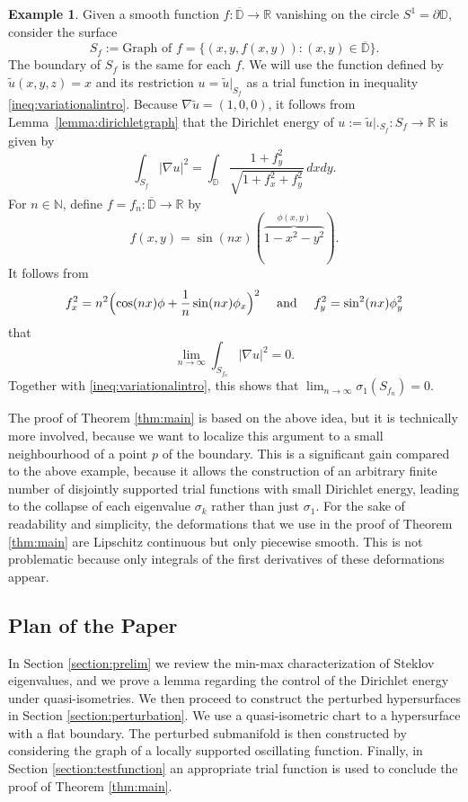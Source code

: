 \documentclass{CUP-JNL-FMP}%
\theoremstyle{definition}
\newtheorem{example}[theorem]{Example}
\numberwithin{equation}{section}
\begin{document}
\begin{example}
Given a smooth function $f\colon \overline{\mathbb{D}}\rightarrow\mathbb{R}$ vanishing on the circle $S^1=\partial\mathbb{D}$, consider the surface
$$
S_f:=\mbox{Graph of }f=
\big\{(x,y,f(x,y)) : (x,y)\in\overline{\mathbb{D}}\big\}.
$$
The boundary of $S_f$ is the same for each $f$.
We will use the function defined by $\widetilde{u}(x,y,z)=x$ and its restriction $u=\widetilde{u}|_{S_f}$ as a trial function in inequality \eqref{ineq:variationalintro}. Because $\nabla\widetilde{u}=(1,0,0)$, it follows from Lemma~\ref{lemma:dirichletgraph} that the Dirichlet energy of $u:=\widetilde{u}
\bigl|\bigr._{{S_f}} \colon S_f\rightarrow\mathbb{R}$ is given by
$$\int_{S_f}|\nabla u|^2=\int_{\mathbb{D}} \frac{1 + f_y^2}{\sqrt{1 + f_x^2+f_y^2}}
\,dxdy.$$
For $n\in\mathbb{N}$, define $f=f_n\colon \overline{\mathbb{D}}\rightarrow\mathbb{R}$ by
$$f(x,y)=\sin(nx)(\overbrace{1-x^2-y^2}^{\phi(x,y)}).$$
It follows from
\begin{gather*}
f_x^2=n^2\Bigl(\cos(nx)\phi+\frac{1}{n}\sin(nx)\phi_x\Bigr)^2\quad\mbox{ and }\quad
f_y^2=\sin^2(nx)\phi_y^2
\end{gather*}
that
$$\lim_{n\to\infty}\int_{S_{f_n}}|\nabla u|^2=0.$$
Together with \eqref{ineq:variationalintro}, this shows that
$\lim_{n\to\infty}\sigma_1(S_{f_n})=0.$
\end{example}


The proof of Theorem \ref{thm:main} is based on the above idea, but it is technically more involved, because we want to localize this argument to a small neighbourhood of a point $p$ of the boundary. This is a significant gain compared to the above example, because it allows the construction of an arbitrary finite number of disjointly supported trial functions with small Dirichlet energy, leading to the collapse of each eigenvalue $\sigma_k$ rather than just $\sigma_1$. For the sake of readability and simplicity, the deformations that we use in the proof of Theorem \ref{thm:main} are Lipschitz continuous but only piecewise smooth. This is not problematic because only integrals of the first derivatives of these deformations appear.


\subsection*{Plan of the Paper}
In Section \ref{section:prelim} we review the min-max characterization of Steklov eigenvalues, and we prove a lemma regarding the control of the Dirichlet energy under quasi-isometries. We then proceed to construct the perturbed hypersurfaces in Section \ref{section:perturbation}. We use a quasi-isometric chart to a hypersurface with a flat boundary. The perturbed submanifold is then constructed by considering the graph
of a locally supported oscillating function. Finally, in Section \ref{section:testfunction} an appropriate trial function is used to conclude the proof of Theorem \ref{thm:main}.
\end{document}
